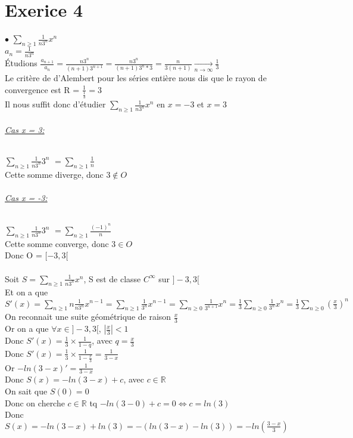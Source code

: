 \documentclass{article}
\author{Frederic Becerril}
\newcommand{\mylim}[2]{\underset{#1 \rightarrow #2}{\longrightarrow}}
\begin{document}
\part*{Exerice 4}

$\bullet$ $\sum_{n\geq 1} \frac{1}{n3^n}x^n$\\
$a_n = \frac{1}{n3^n}$\\
Étudions $\frac{a_{n+1}}{a_n} = \frac{n3^n}{(n+1)3^{n+1}} = \frac{n3^n}{(n+1)3^n * 3} = \frac{n}{3(n+1)} \mylim{n}{\infty} \frac{1}{3}$\\
Le critère de d'Alembert pour les séries entière nous dis que le rayon de convergence est R = $\frac{1}{\frac{1}{3}} = 3$\\
Il nous suffit donc d'étudier $\sum_{n\geq 1} \frac{1}{n3^n}x^n$ en $x = -3$ et $x = 3$
\paragraph{\underline{Cas x = 3:}} $\sum_{n\geq 1} \frac{1}{n3^n}3^n$
$=\sum_{n\geq 1} \frac{1}{n}$\\
Cette somme diverge, donc $3 \notin O$
\paragraph{\underline{Cas x = -3:}} $\sum_{n\geq 1} \frac{1}{n3^n}3^n$
$=\sum_{n\geq 1} \frac{(-1)^n}{n}$\\
Cette somme converge, donc $3 \in O$\\
Donc O = $[-3, 3[$\\
\\
Soit $S = \sum_{n\geq 1} \frac{1}{n3^n}x^n$, S est de classe $C^\infty$ sur $]-3, 3[$\\
Et on a que $S'(x) = \sum_{n\geq 1} n\frac{1}{n3^n}x^{n - 1} = \sum_{n\geq 1} \frac{1}{3^n}x^{n - 1} = \sum_{n\geq 0} \frac{1}{3^{n+1}}x^n = \frac{1}{3} \sum_{n\geq 0} \frac{1}{3^n}x^n = \frac{1}{3} \sum_{n\geq 0} (\frac{x}{3})^n$\\
On reconnait une suite géométrique de raison $\frac{x}{3}$\\
Or on a que $\forall x \in ]-3, 3[$, $|\frac{x}{3}| < 1$\\
Donc $S'(x) = \frac{1}{3} \times \frac{1}{1-q}$, avec $q = \frac{x}{3}$\\
Donc $S'(x) = \frac{1}{3} \times \frac{1}{1 - \frac{x}{3}} = \frac{1}{3 - x}$\\
Or $-ln(3 - x)' = \frac{1}{3-x}$\\
Donc $S(x) = -ln(3 - x) + c$, avec $c \in \mathbb{R}$\\
On sait que $S(0) = 0$\\
Donc on cherche $c \in \mathbb{R}$ tq $-ln(3 - 0) + c = 0 \Leftrightarrow c = ln(3)$\\
Donc $S(x) = -ln(3 - x) + ln(3) = -(ln(3 - x) - ln(3)) = -ln(\frac{3 - x}{3})$\\
\end{document}
